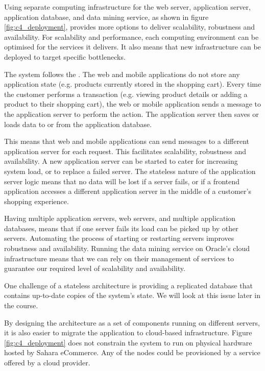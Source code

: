 Using separate computing infrastructure for the web server, application server, application database, and data mining service,
as shown in figure \ref{fig:c4_deployment}, provides more options to deliver scalability, robustness and availability.
For scalability and performance, each computing environment can be optimised for the services it delivers.
It also means that new infrastructure can be deployed to target specific bottlenecks.

\noindent
The system follows the .
The web and mobile applications do not store any application state (e.g. products currently stored in the shopping cart).
Every time the customer performs a transaction (e.g. viewing product details or adding a product to their shopping cart),
the web or mobile application sends a message to the application server to perform the action.
The application server then saves or loads data to or from the application database.

This means that web and mobile applications can send messages to a different application server for each request.
This facilitates scalability, robustness and availability.
A new application server can be started to cater for increasing system load, or to replace a failed server.
The stateless nature of the application server logic means that no data will be lost if a server fails,
or if a frontend application accesses a different application server in the middle of a customer's shopping experience.

Having multiple application servers, web servers, and multiple application databases,
means that if one server fails its load can be picked up by other servers.
Automating the process of starting or restarting servers improves robustness and availability.
Running the data mining service on Oracle's cloud infrastructure means that we can rely
on their management of services to guarantee our required level of scalability and availability.

One challenge of a stateless architecture is providing a replicated database that contains up-to-date copies of the system's state.
We will look at this issue later in the course.

By designing the architecture as a set of components running on different servers, it is also easier to migrate the application to cloud-based infrastructure.
Figure \ref{fig:c4_deployment} does not constrain the system to run on physical hardware hosted by Sahara eCommerce.
Any of the nodes could be provisioned by a service offered by a cloud provider.



